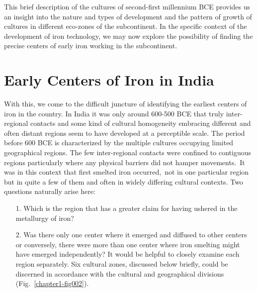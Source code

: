 This brief description of the cultures of second-first millennium BCE provides us an insight into the nature and types of development and the pattern of growth of cultures in different eco-zones of the subcontinent. In the specific context of the development of iron technology, we may now explore the possibility of finding the precise centers of early iron working in the subcontinent.

\vspace{-.2cm}

\section*{Early Centers of Iron in India}\label{chapter3-section-4}

With this, we come to the difficult juncture of identifying the earliest centers of iron in the country. In India it was only around 600-500 BCE that truly inter-regional contacts and some kind of cultural homogeneity embracing different and often distant regions seem to have developed at a perceptible scale. The period before 600 BCE is characterized by the multiple cultures occupying limited geographical regions. The few inter-regional contacts were confined to contiguous regions particularly where any physical barriers did not hamper movements.~It was in this context that first smelted iron occurred,~not in one particular region but in quite a few of them and often in widely differing cultural contexts. Two questions naturally arise here: 
\begin{itemize}
\item[1.] Which is the region that has a greater claim for having ushered in the metallurgy of iron?


\item[2.] Was there only one center where it emerged and diffused to other centers or conversely, there were more than one center where iron smelting might have emerged independently? It would be helpful to closely examine each region separately. Six cultural zones, discussed below briefly, could be discerned in accordance with the cultural and geographical divisions (Fig.~\ref{chapter1-fig002}).


\end{itemize}

